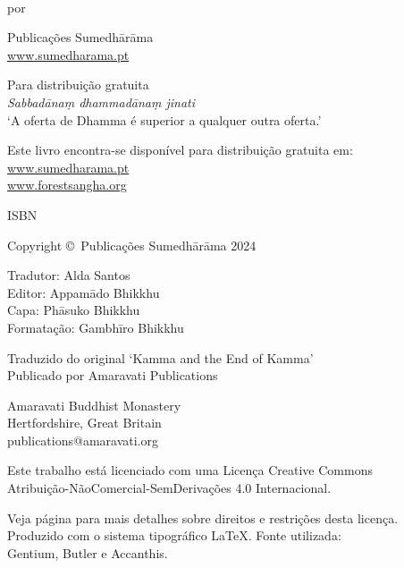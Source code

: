 \cleartoverso
\thispagestyle{empty}

{\copyrightsize
\centering
\setlength{\parindent}{0pt}%
\setlength{\parskip}{0.8\baselineskip}%

\thetitle\\
por \theauthor

Publicações Sumedhārāma\\
\href{https://sumedharama.pt}{www.sumedharama.pt}

Para distribuição gratuita\\
\textit{Sabbadānaṃ dhammadānaṃ jinati}\\
‘A oferta de Dhamma é superior a qualquer outra oferta.’

Este livro encontra-se disponível para distribuição gratuita em:\\
\href{https://sumedharama.pt}{www.sumedharama.pt}\\
\href{https://forestsangha.org}{www.forestsangha.org}

ISBN \theISBN

Copyright \copyright\ Publicações Sumedhārāma 2024

Tradutor: Alda Santos\\
Editor: Appamādo Bhikkhu\\
Capa: Phāsuko Bhikkhu\\
Formatação: Gambhīro Bhikkhu

Traduzido do original `Kamma and the End of Kamma'\\
Publicado por Amaravati Publications

Amaravati Buddhist Monastery\\
Hertfordshire, Great Britain\\
publications@amaravati.org

\vfill

{\footnotesize

Este trabalho está licenciado com uma Licença Creative Commons\\
Atribuição-NãoComercial-SemDerivações 4.0 Internacional.

Veja página \pageref{copyright-details} para mais detalhes sobre direitos e restrições desta licença.\\
Produzido com o sistema tipográfico \LaTeX. Fonte utilizada:\\
Gentium, Butler e Accanthis.

\theEditionInfo

}}
